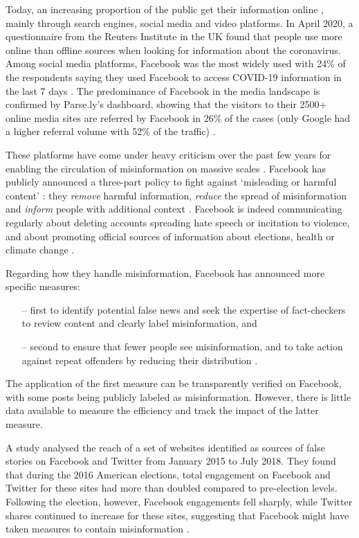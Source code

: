\documentclass[sigconf]{acmart}
\begin{document}
Today, an increasing proportion of the public get their information online \cite{PathwaysNews}, mainly through search engines, social media and video platforms. In April 2020, a questionnaire from the Reuters Institute in the UK found that people use more online than offline sources when looking for information about the coronavirus. Among social media platforms, Facebook was the most widely used with 24\% of the respondents saying they used Facebook to access COVID-19 information in the last 7 days \cite{ReutersQuestionnaire}. The predominance of Facebook in the media landscape is confirmed by Parse.ly's dashboard, showing that the visitors to their 2500+ online media sites are referred by Facebook in 26\% of the cases (only Google had a higher referral volume  with 52\% of the traffic) \cite{ParseLyDashboard}.

These platforms have come under heavy criticism over the past few years for enabling the circulation of misinformation on massive scales \cite{lazer2018science, shao2018spread}. Facebook has publicly announced a three-part policy to fight against `misleading or harmful content' : they \textit{remove} harmful information, \textit{reduce} the spread of misinformation and \textit{inform} people with additional context \cite{FacebookReduce}. Facebook is indeed communicating regularly about deleting accounts spreading hate speech or incitation to violence, and about promoting official sources of information about elections, health or climate change \cite{FacebookRemove1, FacebookRemove2, FacebookRemove3, FacebookRemove4}.

Regarding how they handle misinformation, Facebook has announced more specific measures:
\begin{itemize}
    \item[--] first to identify potential false news and seek the expertise of fact-checkers to review content and clearly label misinformation, and
    \item[--] second to ensure that fewer people see misinformation, and to take action against repeat offenders by reducing their distribution \cite{FacebookMeasuresAgainstMisinformation}.
\end{itemize}
The application of the first measure can be transparently verified on Facebook, with some posts being publicly labeled as misinformation. However, there is little data available to measure the efficiency and track the impact of the latter measure. 

A study analysed the reach of a set of websites identified as sources of false stories on Facebook and Twitter from January 2015 to July 2018. They found that during the 2016 American elections, total engagement on Facebook and Twitter for these sites had more than doubled compared to pre-election levels. Following the election, however, Facebook engagements fell sharply, while Twitter shares continued to increase for these sites, suggesting that Facebook might have taken measures to contain misinformation \cite{allcott2019trends}.
\end{document}
